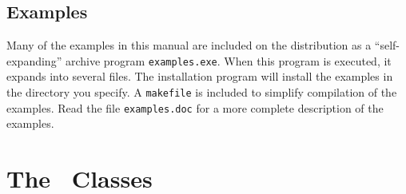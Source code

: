 \documentclass{admbmanual}
\begin{document}
\section{Examples}

Many of the examples in this manual are included on the distribution
as a ``self-expanding'' archive program \texttt{examples.exe}. When
this program is executed, it expands into  several files. 
The installation program will install the examples in the directory you
specify. A \texttt{makefile} is included to simplify compilation of the
examples.
Read the file \texttt{examples.doc} for a more complete description of the
examples.






\chapter{The \scAD\ Classes}

\end{document}
